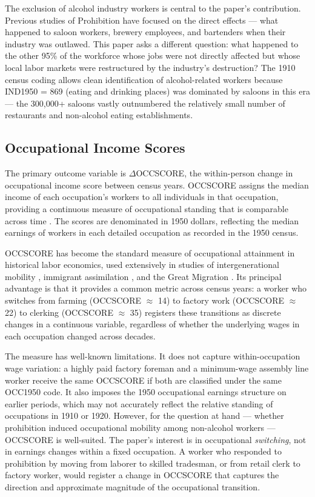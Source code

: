 \documentclass[12pt]{article}
\begin{document}
The exclusion of alcohol industry workers is central to the paper's contribution. Previous studies of Prohibition have focused on the direct effects --- what happened to saloon workers, brewery employees, and bartenders when their industry was outlawed. This paper asks a different question: what happened to the other 95\% of the workforce whose jobs were not directly affected but whose local labor markets were restructured by the industry's destruction? The 1910 census coding allows clean identification of alcohol-related workers because IND1950 = 869 (eating and drinking places) was dominated by saloons in this era --- the 300,000+ saloons vastly outnumbered the relatively small number of restaurants and non-alcohol eating establishments.

\subsection{Occupational Income Scores}

The primary outcome variable is $\Delta$OCCSCORE, the within-person change in occupational income score between census years. OCCSCORE assigns the median income of each occupation's workers to all individuals in that occupation, providing a continuous measure of occupational standing that is comparable across time \citep{abramitzky2012, ward2023}. The scores are denominated in 1950 dollars, reflecting the median earnings of workers in each detailed occupation as recorded in the 1950 census.

OCCSCORE has become the standard measure of occupational attainment in historical labor economics, used extensively in studies of intergenerational mobility \citep{feigenbaum2018, ward2023}, immigrant assimilation \citep{abramitzky2012, abramitzky2014}, and the Great Migration \citep{collins2000, eriksson2020}. Its principal advantage is that it provides a common metric across census years: a worker who switches from farming (OCCSCORE $\approx$ 14) to factory work (OCCSCORE $\approx$ 22) to clerking (OCCSCORE $\approx$ 35) registers these transitions as discrete changes in a continuous variable, regardless of whether the underlying wages in each occupation changed across decades.

The measure has well-known limitations. It does not capture within-occupation wage variation: a highly paid factory foreman and a minimum-wage assembly line worker receive the same OCCSCORE if both are classified under the same OCC1950 code. It also imposes the 1950 occupational earnings structure on earlier periods, which may not accurately reflect the relative standing of occupations in 1910 or 1920. However, for the question at hand --- whether prohibition induced occupational mobility among non-alcohol workers --- OCCSCORE is well-suited. The paper's interest is in occupational \emph{switching}, not in earnings changes within a fixed occupation. A worker who responded to prohibition by moving from laborer to skilled tradesman, or from retail clerk to factory worker, would register a change in OCCSCORE that captures the direction and approximate magnitude of the occupational transition.
\end{document}
